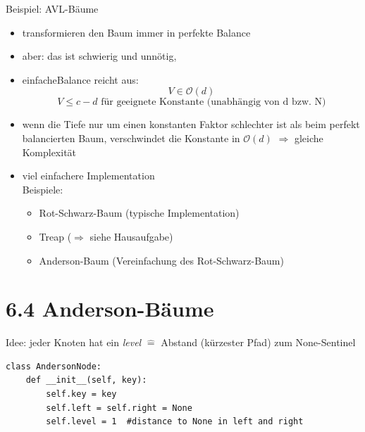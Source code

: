 \documentclass[11pt, fleqn]{scrreprt}
\newcommand{\bigO}[0]{\mathcal{O}}
\begin{document}
Beispiel: AVL-Bäume
\begin{itemize}
    \item transformieren den Baum immer in perfekte Balance
    \item aber: das ist schwierig und unnötig,
\end{itemize}
\begin{itemize}[label={$\Rightarrow$}]
    \item \glqq einfache\grqq Balance reicht aus: \[ V \in \bigO{}(d)\]
    \[ V \leq c - d \text{ für geeignete Konstante (unabhängig von d bzw. N)}\]
    \item wenn die Tiefe nur um einen konstanten Faktor schlechter ist als beim perfekt balancierten Baum, verschwindet die Konstante in $\bigO{}(d)$ $\Rightarrow$ gleiche Komplexität
    \item viel einfachere Implementation \\
    Beispiele:
    \begin{itemize}
        \item Rot-Schwarz-Baum (typische Implementation)
        \item Treap ($\Rightarrow$ siehe Hausaufgabe)
        \item Anderson-Baum (Vereinfachung des Rot-Schwarz-Baum)
    \end{itemize}
\end{itemize}

\section*{6.4 Anderson-Bäume}
Idee: jeder Knoten hat ein \emph{level} $\widehat{=}$ Abstand (kürzester Pfad) zum None-Sentinel

\begin{verbatim}
class AndersonNode:
    def __init__(self, key):
        self.key = key
        self.left = self.right = None
        self.level = 1  #distance to None in left and right
\end{verbatim}
\end{document}
